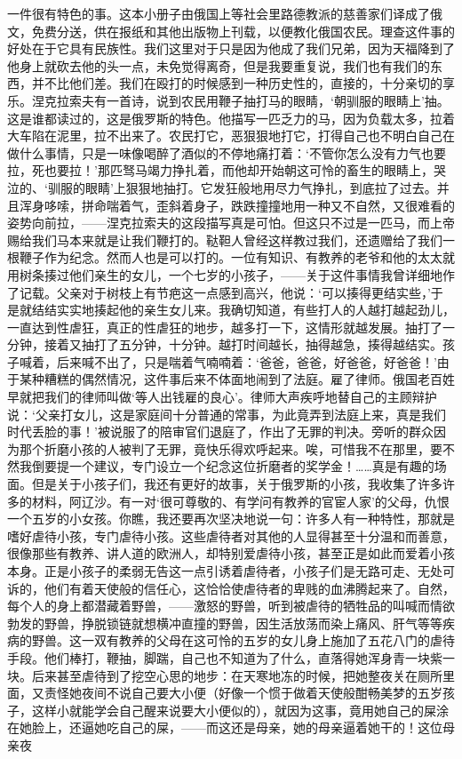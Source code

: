 一件很有特色的事。这本小册子由俄国上等社会里路德教派的慈善家们译成了俄文，免费分送，供在报纸和其他出版物上刊载，以便教化俄国农民。理查这件事的好处在于它具有民族性。我们这里对于只是因为他成了我们兄弟，因为天福降到了他身上就砍去他的头一点，未免觉得离奇，但是我要重复说，我们也有我们的东西，并不比他们差。我们在殴打的时候感到一种历史性的，直接的，十分亲切的享乐。涅克拉索夫有一首诗，说到农民用鞭子抽打马的眼睛，‘朝驯服的眼睛上’抽。这是谁都读过的，这是俄罗斯的特色。他描写一匹乏力的马，因为负载太多，拉着大车陷在泥里，拉不出来了。农民打它，恶狠狠地打它，打得自己也不明白自己在做什么事情，只是一味像喝醉了酒似的不停地痛打着：‘不管你怎么没有力气也要拉，死也要拉！’那匹驽马竭力挣扎着，而他却开始朝这可怜的畜生的眼睛上，哭泣的、‘驯服的眼睛’上狠狠地抽打。它发狂般地用尽力气挣扎，到底拉了过去。并且浑身哆嗦，拼命喘着气，歪斜着身子，跌跌撞撞地用一种又不自然，又很难看的姿势向前拉，——涅克拉索夫的这段描写真是可怕。但这只不过是一匹马，而上帝赐给我们马本来就是让我们鞭打的。鞑靼人曾经这样教过我们，还遗赠给了我们一根鞭子作为纪念。然而人也是可以打的。一位有知识、有教养的老爷和他的太太就用树条揍过他们亲生的女儿，一个七岁的小孩子，——关于这件事情我曾详细地作了记载。父亲对于树枝上有节疤这一点感到高兴，他说：‘可以揍得更结实些，’于是就结结实实地揍起他的亲生女儿来。我确切知道，有些打人的人越打越起劲儿，一直达到性虐狂，真正的性虐狂的地步，越多打一下，这情形就越发展。抽打了一分钟，接着又抽打了五分钟，十分钟。越打时间越长，抽得越急，揍得越结实。孩子喊着，后来喊不出了，只是喘着气喃喃着：‘爸爸，爸爸，好爸爸，好爸爸！’由于某种糟糕的偶然情况，这件事后来不体面地闹到了法庭。雇了律师。俄国老百姓早就把我们的律师叫做‘等人出钱雇的良心’。律师大声疾呼地替自己的主顾辩护说：‘父亲打女儿，这是家庭间十分普通的常事，为此竟弄到法庭上来，真是我们时代丢脸的事！’被说服了的陪审官们退庭了，作出了无罪的判决。旁听的群众因为那个折磨小孩的人被判了无罪，竟快乐得欢呼起来。唉，可惜我不在那里，要不然我倒要提一个建议，专门设立一个纪念这位折磨者的奖学金！……真是有趣的场面。但是关于小孩子们，我还有更好的故事，关于俄罗斯的小孩，我收集了许多许多的材料，阿辽沙。有一对‘很可尊敬的、有学问有教养的官宦人家’的父母，仇恨一个五岁的小女孩。你瞧，我还要再次坚决地说一句：许多人有一种特性，那就是嗜好虐待小孩，专门虐待小孩。这些虐待者对其他的人显得甚至十分温和而善意，很像那些有教养、讲人道的欧洲人，却特别爱虐待小孩，甚至正是如此而爱着小孩本身。正是小孩子的柔弱无告这一点引诱着虐待者，小孩子们是无路可走、无处可诉的，他们有着天使般的信任心，这恰恰使虐待者的卑贱的血沸腾起来了。自然，每个人的身上都潜藏着野兽，——激怒的野兽，听到被虐待的牺牲品的叫喊而情欲勃发的野兽，挣脱锁链就想横冲直撞的野兽，因生活放荡而染上痛风、肝气等等疾病的野兽。这一双有教养的父母在这可怜的五岁的女儿身上施加了五花八门的虐待手段。他们棒打，鞭抽，脚踹，自己也不知道为了什么，直落得她浑身青一块紫一块。后来甚至虐待到了挖空心思的地步：在天寒地冻的时候，把她整夜关在厕所里面，又责怪她夜间不说自己要大小便（好像一个惯于做着天使般酣畅美梦的五岁孩子，这样小就能学会自己醒来说要大小便似的），就因为这事，竟用她自己的屎涂在她脸上，还逼她吃自己的屎，——而这还是母亲，她的母亲逼着她干的！这位母亲夜
